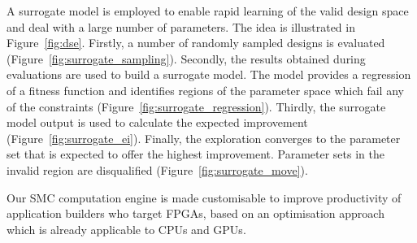 A surrogate model is employed to enable rapid learning of the valid design space and deal with a large number of parameters.
The idea is illustrated in Figure~\ref{fig:dse}.
Firstly, a number of randomly sampled designs is evaluated (Figure~\ref{fig:surrogate_sampling}).
Secondly, the results obtained during evaluations are used to build a surrogate model.
The model provides a regression of a fitness function and identifies regions of the parameter space which fail any of the constraints (Figure~\ref{fig:surrogate_regression}).
Thirdly, the surrogate model output is used to calculate the expected improvement (Figure~\ref{fig:surrogate_ei}).
Finally, the exploration converges to the parameter set that is expected to offer the highest improvement.
Parameter sets in the invalid region are disqualified (Figure~\ref{fig:surrogate_move}).

Our SMC computation engine is made customisable to improve productivity of application builders who target FPGAs, based on an optimisation approach which is already applicable to CPUs and GPUs. 

